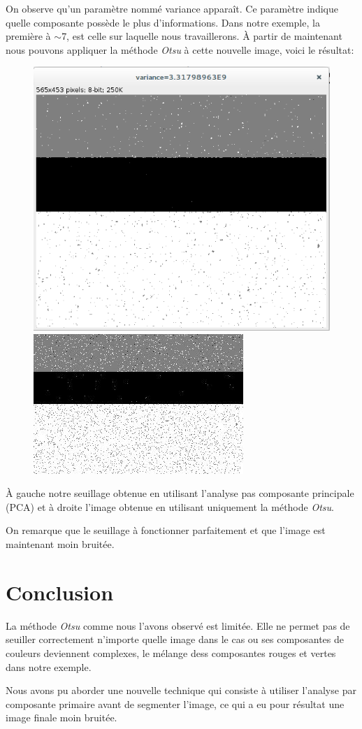 \documentclass[a4paper,12pt]{report}
\begin{document}
On observe qu'un paramètre nommé variance apparaît. Ce paramètre indique quelle composante possède le plus d'informations. Dans notre exemple, la première à $\sim$7, est celle sur laquelle nous travaillerons. À partir de maintenant nous pouvons appliquer la méthode \textit{Otsu} à cette nouvelle image, voici le résultat:

\begin{figure}[!ht]
	\center	
	\includegraphics[scale=0.3]{image/final-result.png}
	\includegraphics[scale=0.7]{image/probleme.jpg}
\end{figure} 

À gauche notre seuillage obtenue en utilisant l'analyse pas composante principale (PCA) et à droite l'image obtenue en utilisant uniquement la méthode \textit{Otsu}.

On remarque que le seuillage à fonctionner parfaitement et que l'image est maintenant moin bruitée.


\section*{Conclusion}

La méthode \textit{Otsu} comme nous l'avons observé est limitée. Elle ne permet pas de seuiller correctement n'importe quelle image dans le cas ou ses composantes de couleurs deviennent complexes, le mélange dess composantes rouges et vertes dans notre exemple.

Nous avons pu aborder une nouvelle technique qui consiste à utiliser l'analyse par composante primaire avant de segmenter l'image, ce qui a eu pour résultat une image finale moin bruitée.
\end{document}
